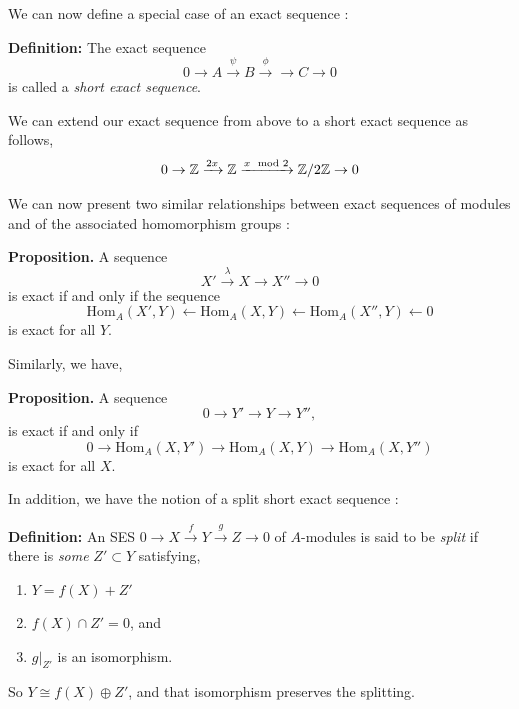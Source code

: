 \documentclass[11pt, reqno]{amsart}
\theoremstyle{plain}
\theoremstyle{definition}
\theoremstyle{example}
\def\Hom{\mathrm{Hom}}
\begin{document}
\par
We can now define a special case of an exact sequence \cite[\S 10.5, p.379]{dummit}:

\par
\textbf{Definition:} The exact sequence $$0 \rightarrow A \xrightarrow{\psi} B \xrightarrow{\phi} \rightarrow C \rightarrow 0$$ is called a \textit{short exact sequence}.

\par
We can extend our exact sequence from above to a short exact sequence as follows,
\begin{align*}
0 \rightarrow \mathbb{Z} \xrightarrow{2x} \mathbb{Z} \xrightarrow{x \mod 2} \mathbb{Z}/2\mathbb{Z} \rightarrow 0
\end{align*}

\par
We can now present two similar relationships between exact sequences of modules and of the associated homomorphism groups \cite[\S 2.2, p. 122]{lang}:

\par
\textbf{Proposition.} A sequence 
$$X' \xrightarrow{\lambda} X \to X'' \to 0$$ is exact if and only if the sequence $$\Hom_A(X', Y) \leftarrow \Hom_A(X, Y) \leftarrow  \Hom_A(X'', Y) \leftarrow 0$$ is exact for all $Y$.

\par
Similarly, we have,

\par
\textbf{Proposition.} A sequence $$0 \rightarrow Y' \rightarrow Y \rightarrow Y'',$$ is exact if and only if $$0 \rightarrow \Hom_A(X, Y') \rightarrow \Hom_A(X, Y) \rightarrow \Hom_A(X, Y'')$$ is exact for all $X$.

\par
In addition, we have the notion of a split short exact sequence \cite[Lec 10, p.6]{dau}:

\par
\textbf{Definition:} An SES $0 \rightarrow X \xrightarrow{f} Y \xrightarrow{g} Z \rightarrow 0$ of $A$-modules is said to be \textit{split} if there is \textit{some} $Z' \subset Y$ satisfying,
\begin{enumerate}
\item $Y = f(X) + Z'$
\item $f(X) \cap Z' = 0$, and
\item $g|_{Z'}$ is an isomorphism.
\end{enumerate}

So $Y \cong f(X) \oplus Z'$, and that isomorphism preserves the splitting.
\end{document}
